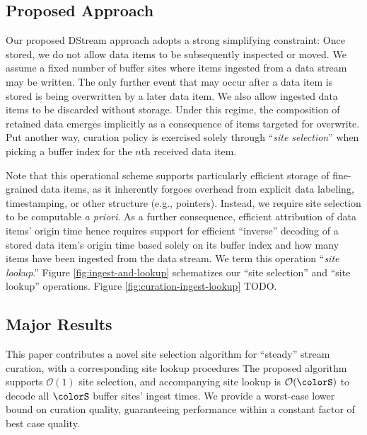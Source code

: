 \subsection{Proposed Approach}


Our proposed DStream approach adopts a strong simplifying constraint: Once stored, we do not allow data items to be subsequently inspected or moved.
We assume a fixed number of buffer sites where items ingested from a data stream may be written.
The only further event that may occur after a data item is stored is being overwritten by a later data item.
We also allow ingested data items to be discarded without storage.
Under this regime, the composition of retained data emerges implicitly as a consequence of items targeted for overwrite.
Put another way, curation policy is exercised solely through ``\textit{site selection}'' when picking a buffer index for the $n$th received data item.

Note that this operational scheme supports particularly efficient storage of fine-grained data items, as it inherently forgoes overhead from explicit data labeling, timestamping, or other structure (e.g., pointers).
Instead, we require site selection to be computable \textit{a priori}.
As a further consequence, efficient attribution of data items' origin time hence requires support for efficient ``inverse'' decoding of a stored data item's origin time based solely on its buffer index and how many items have been ingested from the data stream.
We term this operation ``\textit{site lookup}.''
Figure \ref{fig:ingest-and-lookup} schematizes our ``site selection'' and ``site lookup'' operations.
Figure \ref{fig:curation-ingest-lookup} TODO.




\subsection{Major Results}

This paper contributes a novel site selection algorithm for ``steady'' stream curation, with a corresponding site lookup procedures
The proposed algorithm supports $\mathcal{O}(1)$ site selection, and accompanying site lookup is $\mathcal{O}(\colorS)$ to decode all $\colorS$ buffer sites' ingest times.
We provide a worst-case lower bound on curation quality, guaranteeing performance within a constant factor of best case quality.

